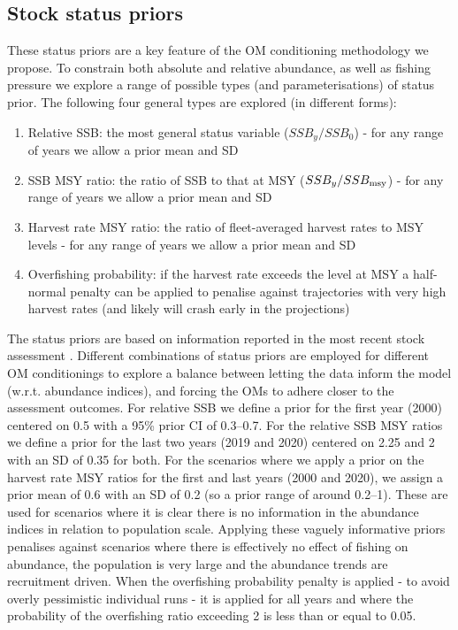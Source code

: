 \documentclass[11pt]{article}
\begin{document}
\subsection{Stock status priors}

These status priors are a key feature of the OM conditioning methodology we propose. To constrain both absolute and relative abundance, as well as fishing pressure we explore a range of possible types (and parameterisations) of status prior. The following four general types are explored (in different forms):

\begin{enumerate}
    \item Relative SSB: the most general status variable ($SSB_y/SSB_0$) - for any range of years we allow a prior mean and SD
    \item SSB MSY ratio: the ratio of SSB to that at MSY ($SSB_y/SSB_{\rm msy}$) - for any range of years we allow a prior mean and SD
    \item Harvest rate MSY ratio: the ratio of fleet-averaged harvest rates to MSY levels - for any range of years we allow a prior mean and SD
    \item Overfishing probability: if the harvest rate exceeds the level at MSY a half-normal penalty can be applied to penalise against trajectories with very high harvest rates (and likely will crash early in the projections)
\end{enumerate}

The status priors are based on information reported in the most recent stock assessment \cite{albsa}. Different combinations of status priors are employed for different OM conditionings to explore a balance between letting the data inform the model (w.r.t. abundance indices), and forcing the OMs to adhere closer to the assessment outcomes. For relative SSB we define a prior for the first year (2000) centered on 0.5 with a 95\% prior CI of 0.3--0.7. For the relative SSB MSY ratios we define a prior for the last two years (2019 and 2020) centered on 2.25 and 2 with an SD of 0.35 for both. For the scenarios where we apply a prior on the harvest rate MSY ratios for the first and last years (2000 and 2020), we assign a prior mean of 0.6 with an SD of 0.2 (so a prior range of around 0.2--1). These are used for scenarios where it is clear there is no information in the abundance indices in relation to population scale. Applying these vaguely informative priors penalises against scenarios where there is effectively no effect of fishing on abundance, the population is very large and the abundance trends are recruitment driven. When the overfishing probability penalty is applied - to avoid overly pessimistic individual runs - it is applied for all years and where the probability of the overfishing ratio exceeding 2 is less than or equal to 0.05.
\end{document}
